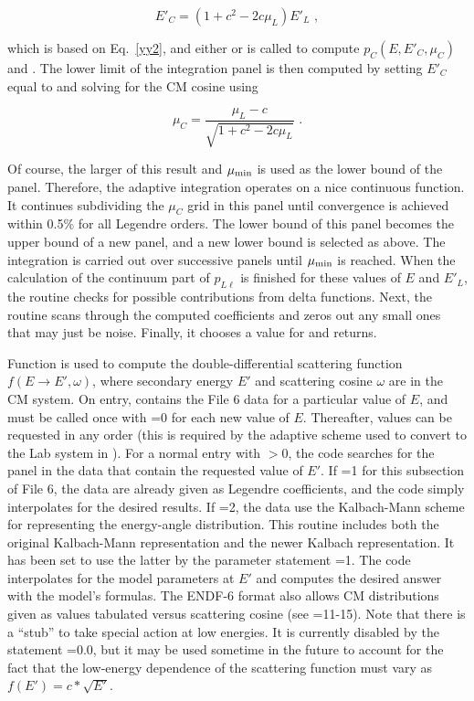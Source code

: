 \begin{equation}
   E'_C=(1+c^2-2c\mu_L)E'_L \,\,,
\end{equation}

\noindent
which is based on Eq.~\ref{yy2}, and either
 or
 is called to compute
$p_C(E,E'_C,\mu_C)$ and .  The lower limit of
the integration panel is then computed by setting
$E'_C$ equal to  and solving for the CM cosine using

\begin{equation}
   \mu_C=\frac{\mu_L-c}{\sqrt{1+c^2-2c\mu_L}} \,\,.
\end{equation}

\noindent
Of course, the larger of this result and $\mu_{\rm min}$ is used as
the lower bound of the panel.  Therefore, the adaptive integration operates
on a nice continuous function.  It continues subdividing the $\mu_C$ grid
in this panel until convergence is achieved within 0.5\% for all
Legendre orders.  The lower bound of this panel
becomes the upper bound of a new panel, and a new lower bound is selected
as above.  The integration is carried out over successive panels until
$\mu_{\rm min}$ is reached.  When the calculation of the continuum part
of $p_{L\ell}$ is finished for these values of $E$ and $E'_L$, the
routine checks for possible contributions from delta functions.  Next,
the routine scans through the computed coefficients and zeros out any small
ones that may just be noise.  Finally, it chooses a value for
 and returns.

Function  is used to compute
the double-differential scattering function $f(E{\rightarrow}E',\omega)$,
where secondary energy $E'$ and scattering cosine $\omega$ are in the
CM system.  On entry,  contains the File 6 data for
a particular value of $E$, and  must be called once
with =0 for each new value of $E$.  Thereafter,
 values can be requested in any order (this is
required by the adaptive scheme used to convert to the Lab system in
).  For a normal entry with $>$0, the code searches
for the panel in the data that contain the requested value of $E'$.
If =1 for this subsection of File 6, the data are already
given as Legendre coefficients, and the code simply interpolates for the
desired results.  If =2, the data use the Kalbach-Mann scheme
for representing the energy-angle distribution.  This routine includes
both the original Kalbach-Mann representation\cite{km} and the newer
Kalbach representation\cite{k86}.  It has been set to use the latter
by the parameter statement =1.  The code interpolates for
the model parameters at $E'$ and computes the desired answer with the
model's formulas.  The ENDF-6 format also allows CM distributions given
as values tabulated versus scattering cosine (see =11-15).
Note that there is a ``stub'' to take special action at low energies.
It is currently disabled by the statement =0.0, but it may
be used sometime in the future to account for the fact that the
low-energy dependence of the scattering function must vary as
$f(E')=c*\sqrt{E'}$.

